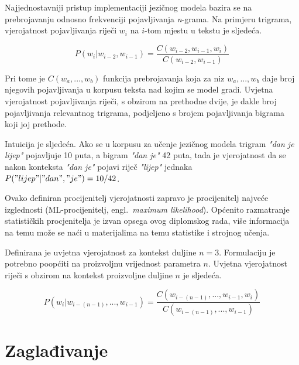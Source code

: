 \documentclass[times, utf8, diplomski, numeric]{fer}
\begin{document}
Najjednostavniji pristup implementaciji jezičnog modela bazira se na prebrojavanju odnosno frekvenciji pojavljivanja \textit{n}-grama. Na primjeru trigrama, vjerojatnost pojavljivanja riječi $w_i$ na $i$-tom mjestu u tekstu je sljedeća.

\[
P(w_i | w_{i - 2}, w_{i - 1}) = \frac{C(w_{i - 2}, w_{i - 1}, w_i)}{C(w_{i - 2}, w_{i - 1})}
\]

Pri tome je $C(w_a, ... , w_b)$ funkcija prebrojavanja koja za niz $w_a, ... , w_b$ daje broj njegovih pojavljivanja u korpusu teksta nad kojim se model gradi. Uvjetna vjerojatnost pojavljivanja riječi, s obzirom na prethodne dvije, je dakle broj pojavljivanja relevantnog trigrama, podjeljeno s brojem pojavljivanja bigrama koji joj prethode. 

Intuicija je sljedeća. Ako se u korpusu za učenje jezičnog modela trigram \textit{"dan je lijep"} pojavljuje 10 puta, a bigram \textit{"dan je"} 42 puta, tada je vjerojatnost da se nakon konteksta \textit{"dan je"} pojavi riječ \textit{"lijep"} jednaka $P("lijep" | "dan", "je") = 10 / 42$.

Ovako definiran procijenitelj vjerojatnosti zapravo je procijenitelj  najveće izglednosti (ML-procijenitelj, engl.\ \textit{maximum likelihood}). Općenito razmatranje statističkih procjenitelja je izvan opsega ovog diplomskog rada, više informacija na temu može se naći u materijalima na temu statistike i strojnog učenja.

Definirana je uvjetna vjerojatnost za kontekst duljine $n = 3$. Formulaciju je potrebno poopćiti na proizvoljnu vrijednost parametra $n$. Uvjetna vjerojatnost riječi s obzirom na kontekst proizvoljne duljine $n$ je sljedeća.

\begin{equation}
\label{eq:ngram_freq}
P(w_i | w_{i - (n - 1)}, ... , w_{i - 1}) = \frac{C(w_{i - (n - 1)}, ... , w_{i - 1}, w_i)}{C(w_{i - (n - 1)}, ... , w_{i - 1})}
\end{equation}

\section{Zaglađivanje}
\end{document}
